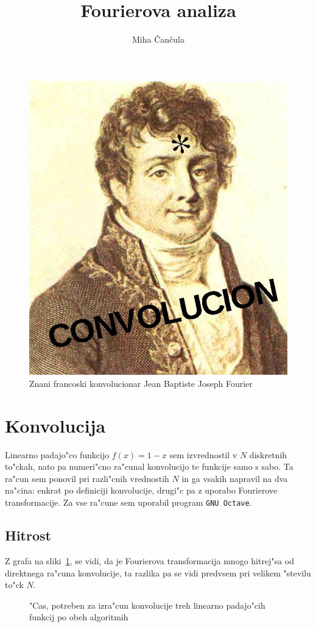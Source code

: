 \documentclass[a4paper,10pt]{article}
\title{Fourierova analiza}
\author{Miha \v Can\v cula}
\begin{document}
  \maketitle

\begin{figure}[h]
  \centering
  \includegraphics[width=.5\textwidth]{Convolucion}
  \caption{Znani francoski konvolucionar Jean Baptiste Joseph Fourier}
\end{figure}

\section{Konvolucija}

Linearno padajo"co funkcijo $f(x) = 1-x$ sem izvrednostil v $N$ diskretnih to"ckah, nato pa numeri"cno ra"cunal konvolucijo te funkcije samo s sabo. Ta ra"cun sem ponovil pri razli"cnih vrednostih $N$ in ga vsakih napravil na dva na"cina: enkrat po definiciji konvolucije, drugi"c pa z uporabo Fourierove transformacije. Za vse ra"cune sem uporabil program \texttt{GNU Octave}. 

\subsection{Hitrost}

Z grafa na sliki~\ref{fig:konv-cas}, se vidi, da je Fourierova transformacija mnogo hitrej"sa od direktnega ra"cuna konvolucije, ta razlika pa se vidi predvsem pri velikem "stevilu to"ck $N$. 

\begin{figure}[h]
 \centering

\caption{"Cas, potreben za izra"cun konvolucije treh linearno padajo"cih funkcij po obeh algoritmih}
\label{fig:konv-cas}
\end{figure}
\end{document}
